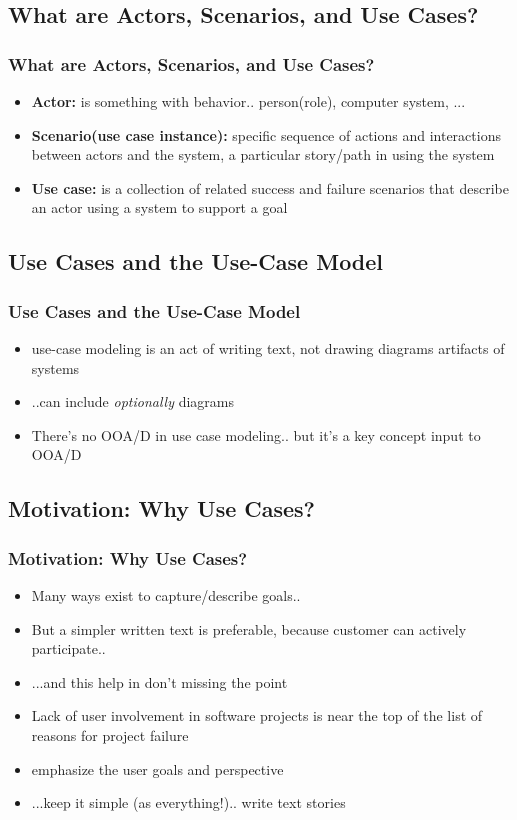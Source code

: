 \documentclass{beamer}
\begin{document}
\subsection{What are Actors, Scenarios, and Use Cases?}
\begin{frame}
	\frametitle{What are Actors, Scenarios, and Use Cases?}
	\begin{itemize}
	\item<+-> \textbf{Actor:} is something with behavior.. person(role), computer system, ...
	\item<+-> \textbf{Scenario(use case instance):} specific sequence of actions and interactions between actors and the system, a particular story/path in using the system
	\item<+-> \textbf{Use case:} is a collection of related success and failure scenarios that describe
an actor using a system to support a goal 
	\end{itemize}
\end{frame}

\subsection{Use Cases and the Use-Case Model}
\begin{frame}
	\frametitle{Use Cases and the Use-Case Model}
	\begin{itemize}
		\item<+-> use-case modeling is an act of writing text, not drawing diagrams artifacts of systems
		\item<+-> ..can include \textit{optionally} diagrams
		\item<+-> There's no OOA/D in use case modeling.. but it's a key concept input to OOA/D
    \end{itemize}
\end{frame}

\subsection{Motivation: Why Use Cases?}
\begin{frame}
	\frametitle{Motivation: Why Use Cases?}
	\begin{itemize}
		\item<+-> Many ways exist to capture/describe goals..
		\item<+-> But a simpler written text is preferable, because customer can actively participate..  
		\item<+-> ...and this help in don't missing the point 
		\item<+-> Lack of user involvement in software projects is near the top of the list of reasons for project failure
		\item<+-> emphasize the user goals and perspective
		\item<+-> ...keep it simple (as everything!).. write text stories
    \end{itemize}
\end{frame}
\end{document}
